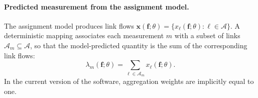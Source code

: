 \paragraph{Predicted measurement from the assignment model.}
The assignment model produces link flows $\bm{x}(\bm f;\theta)=\{x_\ell(\bm f;\theta):\ell\in\mathcal{A}\}$.
A deterministic mapping associates each measurement $m$ with a subset of links $\mathcal{A}_m\subseteq\mathcal{A}$,
so that the model-predicted quantity is the sum of the corresponding link flows:
\[
\lambda_m(\bm f;\theta)
=
\sum_{\ell\in\mathcal{A}_m} x_\ell(\bm f;\theta).
\]
In the current version of the software, aggregation weights are implicitly equal to one.


